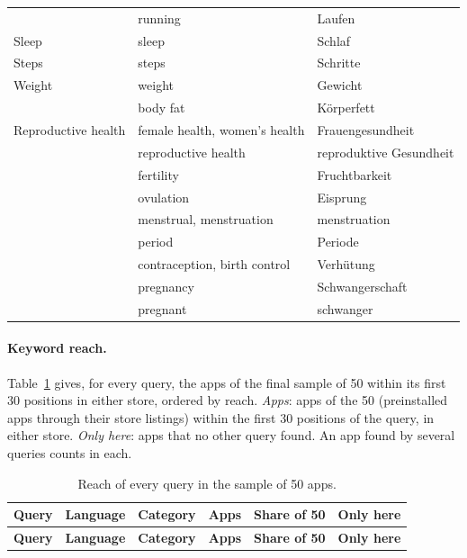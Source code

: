 \begin{table}[H]
\begin{singlespace}
\begin{tabularx}{\textwidth}{@{}>{\raggedright\arraybackslash}p{3.2cm}>{\raggedright\arraybackslash}X>{\raggedright\arraybackslash}X@{}}
 & running & Laufen \\
\addlinespace
Sleep & sleep & Schlaf \\
\addlinespace
Steps & steps & Schritte \\
\addlinespace
Weight & weight & Gewicht \\
 & body fat & Körperfett \\
\midrule
Reproductive health & female health, women's health & Frauengesundheit \\
 & reproductive health & reproduktive Gesundheit \\
 & fertility & Fruchtbarkeit \\
 & ovulation & Eisprung \\
 & menstrual, menstruation & menstruation \\
 & period & Periode \\
 & contraception, birth control & Verhütung \\
 & pregnancy & Schwangerschaft \\
 & pregnant & schwanger \\
\bottomrule
\end{tabularx}
\end{singlespace}
\end{table}

\paragraph{Keyword reach.} Table~\ref{tab:keyword-reach-all} gives, for every query, the apps of
the final sample of 50 within its first 30 positions in either store, ordered by reach.
\emph{Apps}: apps of the 50 (preinstalled apps through their store listings) within the first 30
positions of the query, in either store. \emph{Only here}: apps that no other query found. An app
found by several queries counts in each.

\begin{singlespace}
\small
\begin{longtable}{@{}lllrrr@{}}
\caption{Reach of every query in the sample of 50 apps.}\label{tab:keyword-reach-all}\\
\toprule
\textbf{Query} & \textbf{Language} & \textbf{Category} & \textbf{Apps} & \textbf{Share of 50} & \textbf{Only here} \\
\midrule
\endfirsthead
\toprule
\textbf{Query} & \textbf{Language} & \textbf{Category} & \textbf{Apps} & \textbf{Share of 50} & \textbf{Only here} \\
\midrule
\endhead
\end{longtable}
\end{singlespace}

